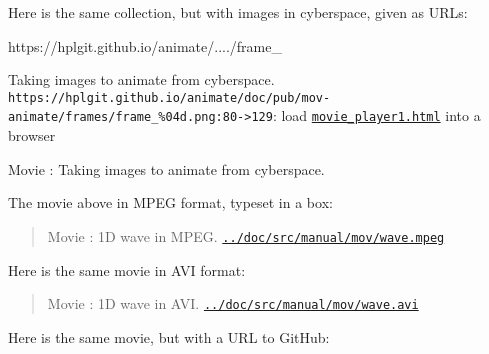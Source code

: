 \documentclass[%
oneside,                 %
final,                   %
10pt]{article}
\newenvironment{doconce:movie}{}{}
\newcounter{doconce:movie:counter}
\begin{document}
Here is the same collection, but with images in cyberspace, given as URLs:

\bccq
https://hplgit.github.io/animate/..../frame_%
\eccq


\begin{doconce:movie}
\begin{center}
Taking images to animate from cyberspace. \Verb!https://hplgit.github.io/animate/doc/pub/mov-animate/frames/frame_%
\end{center}

\begin{center}  %
Movie : Taking images to animate from cyberspace.
\end{center}
\end{doconce:movie}


The movie above in MPEG format, typeset in a box:


\begin{center}
\begin{Sbox}
\begin{minipage}{0.85\linewidth}

\begin{doconce:movie}
\begin{quote}
Movie : 1D wave in MPEG. \label{mov:wave} \href{run:../doc/src/manual/mov/wave.mpeg}{\nolinkurl{../doc/src/manual/mov/wave.mpeg}}
\end{quote}
\end{doconce:movie}
\end{minipage}
\end{Sbox}
\fbox{\TheSbox}
\end{center}

Here is the same movie in AVI format:


\begin{doconce:movie}
\begin{quote}
Movie : 1D wave in AVI. \href{run:../doc/src/manual/mov/wave.avi}{\nolinkurl{../doc/src/manual/mov/wave.avi}}
\end{quote}
\end{doconce:movie}


Here is the same movie, but with a URL to GitHub:
\end{document}
